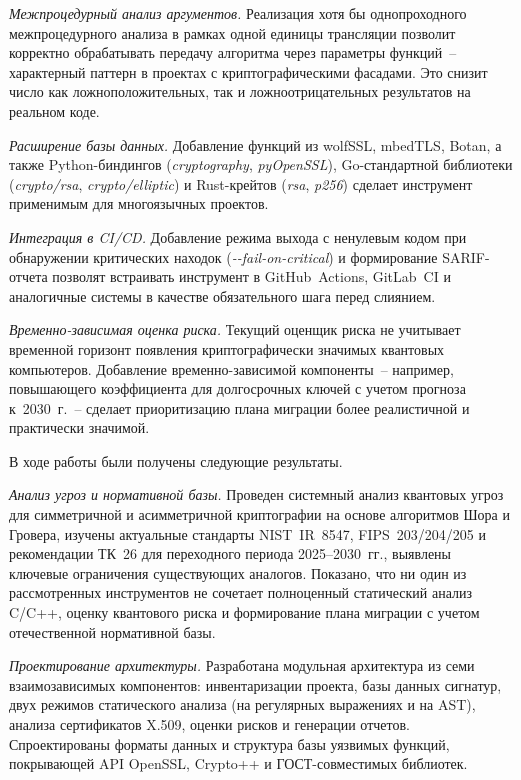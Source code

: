 \documentclass{itmo-vkr}
\newcommand{\code}[1]{\textit{#1}}
\begin{document}
\noindent\textit{Межпроцедурный анализ аргументов.}\quad
Реализация хотя бы однопроходного межпроцедурного анализа
в рамках одной единицы трансляции позволит корректно обрабатывать
передачу алгоритма через параметры функций~-- характерный
паттерн в проектах с криптографическими фасадами.
Это снизит число как ложноположительных, так и
ложноотрицательных результатов на реальном коде.

\noindent\textit{Расширение базы данных.}\quad
Добавление функций из wolfSSL, mbedTLS, Botan, а также
Python-биндингов (\code{cryptography}, \code{pyOpenSSL}),
Go-стандартной библиотеки (\code{crypto/rsa},
\code{crypto/elliptic}) и Rust-крейтов (\code{rsa},
\code{p256}) сделает инструмент применимым для
многоязычных проектов.

\noindent\textit{Интеграция в CI/CD.}\quad
Добавление режима выхода с ненулевым кодом при обнаружении
критических находок (\code{{-}{-}fail-on-critical}) и
формирование SARIF-отчета позволят встраивать инструмент
в GitHub~Actions, GitLab~CI и аналогичные системы в качестве
обязательного шага перед слиянием.

\noindent\textit{Временно-зависимая оценка риска.}\quad
Текущий оценщик риска не учитывает временной горизонт
появления криптографически значимых квантовых компьютеров.
Добавление временно-зависимой компоненты~-- например, повышающего
коэффициента для долгосрочных ключей с учетом прогноза к~2030~г.~--
сделает приоритизацию плана миграции более реалистичной и
практически значимой.



В ходе работы были получены следующие результаты.

\textit{Анализ угроз и нормативной базы.} Проведен системный анализ квантовых угроз для симметричной и асимметричной криптографии на основе алгоритмов Шора и Гровера, изучены актуальные стандарты NIST~IR~8547, FIPS~203/204/205 и рекомендации ТК~26 для переходного периода 2025--2030~гг., выявлены ключевые ограничения существующих аналогов. Показано, что ни один из рассмотренных инструментов не сочетает полноценный статический анализ C/C++, оценку квантового риска и формирование плана миграции с учетом отечественной нормативной базы.

\textit{Проектирование архитектуры.} Разработана модульная архитектура из семи взаимозависимых компонентов: инвентаризации проекта, базы данных сигнатур, двух режимов статического анализа (на регулярных выражениях и на AST), анализа сертификатов X.509, оценки рисков и генерации отчетов. Спроектированы форматы данных и структура базы уязвимых функций, покрывающей API OpenSSL, Crypto++ и ГОСТ-совместимых библиотек.
\end{document}
